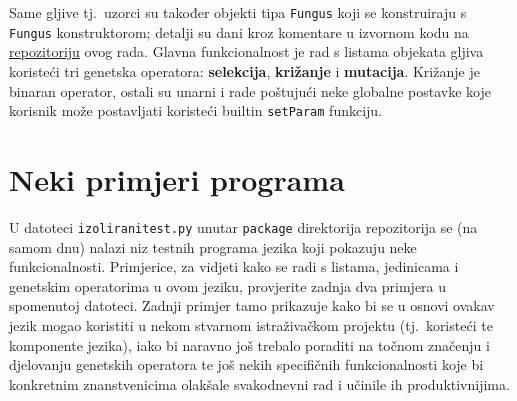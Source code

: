 \documentclass[12pt]{scrartcl}
\begin{document}
Same gljive tj.\ uzorci su također objekti tipa \verb|Fungus| koji se konstruiraju s \verb|Fungus| konstruktorom; detalji su dani kroz komentare
u izvornom kodu na \href{https://github.com/mraguzin/ip-projekt}{repozitoriju} ovog rada. Glavna funkcionalnost je rad s listama objekata gljiva
koristeći tri genetska operatora: \textbf{selekcija}, \textbf{križanje} i \textbf{mutacija}. Križanje je binaran operator, ostali su unarni i rade
poštujući neke globalne postavke koje korisnik može postavljati koristeći builtin \verb|setParam| funkciju.

\section{Neki primjeri programa}
U datoteci \verb|izoliranitest.py| unutar \verb|package| direktorija repozitorija se (na samom dnu) nalazi niz testnih programa jezika koji
pokazuju neke funkcionalnosti. Primjerice, za vidjeti kako se radi s listama, jedinicama i genetskim operatorima u ovom jeziku, provjerite
zadnja dva primjera u spomenutoj datoteci. Zadnji primjer tamo prikazuje kako bi se u osnovi ovakav jezik mogao koristiti u nekom stvarnom
istraživačkom projektu (tj.\ koristeći te komponente jezika), iako bi naravno još trebalo poraditi na točnom značenju
i djelovanju genetskih operatora te još nekih specifičnih
funkcionalnosti koje bi konkretnim znanstvenicima olakšale svakodnevni rad i učinile ih produktivnijima.

\end{document}
